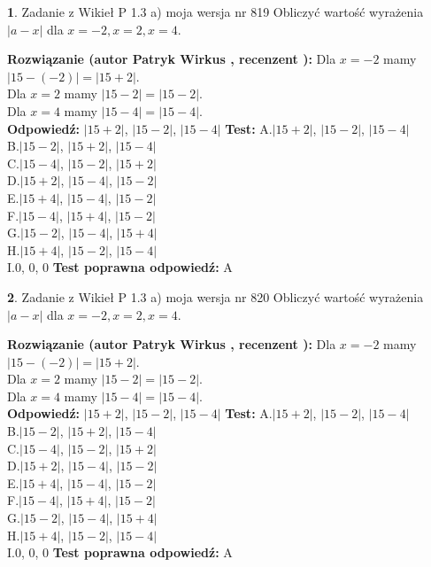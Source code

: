 \documentclass[12pt, a4paper]{article}
\theoremstyle{definition} %
\newtheorem{zad}{}
\newcommand{\zadStart}[1]{\begin{zad}#1\newline}
\newcommand{\zadStop}{\end{zad}}
\newcommand{\rozwStart}[2]{\noindent \textbf{Rozwiązanie (autor #1 , recenzent #2): }\newline}
\newcommand{\rozwStop}{\newline}
\newcommand{\odpStart}{\noindent \textbf{Odpowiedź:}\newline}
\newcommand{\odpStop}{\newline}
\newcommand{\testStart}{\noindent \textbf{Test:}\newline}
\newcommand{\testStop}{\newline}
\newcommand{\kluczStart}{\noindent \textbf{Test poprawna odpowiedź:}\newline}
\newcommand{\kluczStop}{\newline}
\begin{document}
\zadStart{Zadanie z Wikieł P 1.3 a) moja wersja nr 819}
Obliczyć wartość wyrażenia $|a - x|$ dla $x=-2,x=2,x=4$.
\zadStop
\rozwStart{Patryk Wirkus}{}
Dla $x = -2$ mamy $|15 - (-2)| = |15 + 2|$.\\
Dla $x = 2$ mamy $|15 - 2| = |15 - 2|$.\\
Dla $x = 4$ mamy $|15 - 4| = |15 - 4|$.\\
\rozwStop
\odpStart
$|15 + 2|$, $|15 - 2|$, $|15 - 4|$
\odpStop
\testStart
A.$|15 + 2|$, $|15 - 2|$, $|15 - 4|$\\
B.$|15 - 2|$, $|15 + 2|$, $|15 - 4|$\\
C.$|15 - 4|$, $|15 - 2|$, $|15 + 2|$\\
D.$|15 + 2|$, $|15 - 4|$, $|15 - 2|$\\
E.$|15 + 4|$, $|15 - 4|$, $|15 - 2|$\\
F.$|15 - 4|$, $|15 + 4|$, $|15 - 2|$\\
G.$|15 - 2|$, $|15 - 4|$, $|15 + 4|$\\
H.$|15 + 4|$, $|15 - 2|$, $|15 - 4|$\\
I.$0$, $0$, $0$
\testStop
\kluczStart
A
\kluczStop



\zadStart{Zadanie z Wikieł P 1.3 a) moja wersja nr 820}
Obliczyć wartość wyrażenia $|a - x|$ dla $x=-2,x=2,x=4$.
\zadStop
\rozwStart{Patryk Wirkus}{}
Dla $x = -2$ mamy $|15 - (-2)| = |15 + 2|$.\\
Dla $x = 2$ mamy $|15 - 2| = |15 - 2|$.\\
Dla $x = 4$ mamy $|15 - 4| = |15 - 4|$.\\
\rozwStop
\odpStart
$|15 + 2|$, $|15 - 2|$, $|15 - 4|$
\odpStop
\testStart
A.$|15 + 2|$, $|15 - 2|$, $|15 - 4|$\\
B.$|15 - 2|$, $|15 + 2|$, $|15 - 4|$\\
C.$|15 - 4|$, $|15 - 2|$, $|15 + 2|$\\
D.$|15 + 2|$, $|15 - 4|$, $|15 - 2|$\\
E.$|15 + 4|$, $|15 - 4|$, $|15 - 2|$\\
F.$|15 - 4|$, $|15 + 4|$, $|15 - 2|$\\
G.$|15 - 2|$, $|15 - 4|$, $|15 + 4|$\\
H.$|15 + 4|$, $|15 - 2|$, $|15 - 4|$\\
I.$0$, $0$, $0$
\testStop
\kluczStart
A
\kluczStop
\end{document}
